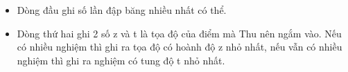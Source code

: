 \begin{itemize}
	\item     Dòng đầu ghi số lần đập băng nhiều nhất có thể.   
	\item     Dòng thứ hai ghi 2 số z và t là tọa độ của điểm mà Thu nên ngắm vào. Nếu có nhiều nghiệm thì ghi ra tọa độ có hoành độ z nhỏ nhất, nếu vẫn có nhiều nghiệm thì ghi ra nghiệm có tung độ t nhỏ nhất.   
\end{itemize}